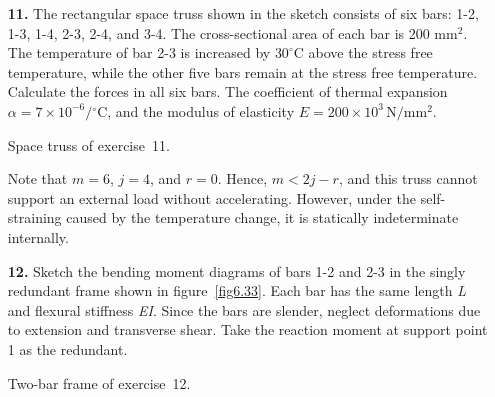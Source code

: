 \documentclass{AeroStructure-ERJohnson}
\begin{document}
\begin{exercise}
\begin{enumerate}[\textbf{2.}]
\pagebreak

\item[\textbf{11.}] The rectangular space truss shown in the sketch consists of six bars: 1-2, 1-3, 1-4, 2-3, 2-4, and 3-4. The cross-sectional area of each bar is 200 mm$^2$. The temperature of bar 2-3 is increased by $30^{\circ} \mathrm{C}$ above the stress free temperature, while the other five bars remain at the stress free temperature. Calculate the forces in all six bars. The coefficient of thermal expansion $\alpha=7 \times 10^{-6} /{ }^{\circ} \mathrm{C}$, and the modulus of elasticity $E=200 \times 10^{3}\,\mathrm{N} / \mathrm{mm}^{2}$.


{\caption{Space truss of exercise~11.\label{fig6.32}}}


\noindent Note that $m=6$, $j=4$, and $r=0$. Hence, $m<2 j-r$, and this truss cannot support an external load without accelerating. However, under the self-straining caused by the temperature change, it is statically indeterminate internally.


\item[\textbf{12.}]  Sketch the bending moment diagrams of bars 1-2 and 2-3 in the singly redundant frame shown in figure~\ref{fig6.33}. Each bar has the same length \textit{L} and flexural stiffness \textit{EI}. Since the bars are slender, neglect deformations due to extension and transverse shear. Take the reaction moment at support point 1 as the redundant.

{\def\floatbelowskip{-3pt}%
{\caption{Two-bar frame of exercise~12.\label{fig6.33}}}}


\end{enumerate}
\end{exercise}
\end{document}
